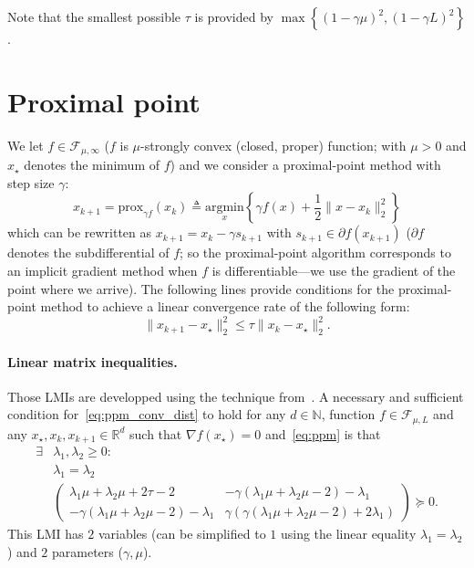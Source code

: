 \documentclass{article}
\renewcommand{\leq}{\leqslant}
\renewcommand{\geq}{\geqslant}
\renewcommand{\succeq}{\succcurlyeq}
\newcommand{\argmin}{\mathrm{argmin}}
\begin{document}
Note that the smallest possible $\tau$ is provided by $\max\left\{(1-\gamma\mu)^2,(1-\gamma L)^2\right\}$.


\section{Proximal point}
We let $f\in\mathcal{F}_{\mu,\infty}$ ($f$ is $\mu$-strongly convex (closed, proper) function; with $\mu>0$ and $x_\star$ denotes the minimum of $f$) and we consider a proximal-point method with step size $\gamma$:
\begin{equation}\label{eq:ppm}
x_{k+1}=\mathrm{prox}_{\gamma f}(x_k)\triangleq\underset{x}{\argmin} \left\{ \gamma f(x)+\frac{1}{2}\|x-x_k\|^2_2\right\}
\end{equation}
which can be rewritten as $x_{k+1}=x_k-\gamma s_{k+1}$ with $s_{k+1}\in\partial f(x_{k+1})$ ($\partial f$ denotes the subdifferential of $f$; so the proximal-point algorithm corresponds to an implicit gradient method when $f$ is differentiable---we use the gradient of the point where we arrive).
The following lines provide conditions for the proximal-point method to achieve a linear convergence rate of the following form:
\begin{equation}\label{eq:ppm_conv_dist}
\|x_{k+1}-x_\star\|^2_2 \leq \tau \|x_{k}-x_\star\|^2_2.
\end{equation}

\paragraph{Linear matrix inequalities.} Those LMIs are developped using the technique from~\cite{taylor2017exact}. A necessary and sufficient condition for~\eqref{eq:ppm_conv_dist} to hold for any $d\in\mathbb{N}$, function $f\in\mathcal{F}_{\mu,L}$ and any $x_\star,x_k,x_{k+1}\in\mathbb{R}^d$ such that $\nabla f(x_\star)=0$ and~\eqref{eq:ppm} is that
\begin{equation*}
\begin{aligned}
\exists &\lambda_1,\lambda_2\geq 0:\\
&\lambda_1=\lambda_2\\
&\begin{pmatrix}
\lambda_1 \mu +\lambda_2 \mu +2 \tau -2 & -\gamma  (\lambda_1 \mu +\lambda_2 \mu -2)-\lambda_1 \\
 -\gamma  (\lambda_1 \mu +\lambda_2 \mu -2)-\lambda_1 & \gamma  (\gamma  (\lambda_1 \mu +\lambda_2 \mu -2)+2 \lambda_1)
\end{pmatrix}\succeq 0.
\end{aligned}
\end{equation*}
This LMI has $2$ variables (can be simplified to $1$ using the linear equality $\lambda_1=\lambda_2$) and $2$ parameters ($\gamma,\mu$).
\end{document}
